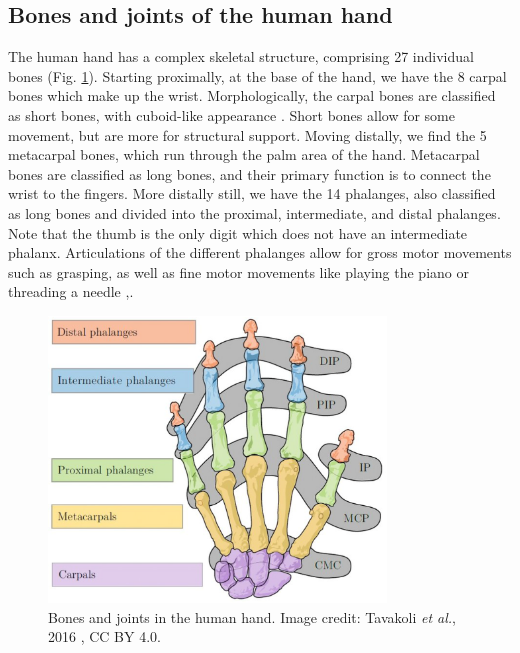 \documentclass[12pt]{article}
\begin{document}
\subsection*{Bones and joints of the human hand}
The human hand has a complex skeletal structure, comprising 27 individual bones \citep{kumar2009hand,panchal2013skeletal} (Fig. \ref{fig:bonesJoints}). Starting proximally, at the base of the hand, we have the 8 carpal bones which make up the wrist. Morphologically, the carpal bones are classified as short bones, with cuboid-like appearance \citep{openStaxBones}. Short bones allow for some movement, but are more for structural support. Moving distally, we find the 5 metacarpal bones, which run through the palm area of the hand. Metacarpal bones are classified as long bones, and their primary function is to connect the wrist to the fingers. More distally still, we have the 14 phalanges, also classified as long bones and divided into the proximal, intermediate, and distal phalanges. Note that the thumb is the only digit which does not have an intermediate phalanx. Articulations of the different phalanges allow for gross motor movements such as grasping, as well as fine motor movements like playing the piano or threading a needle \citep{duncan2013biomechanics},.

\begin{figure}[h!]
\centering
\includegraphics[width=0.8\textwidth]{images/bones_joints_hand.png}
\caption{Bones and joints in the human hand. Image credit: Tavakoli \textit{et al.}, 2016 \citep{tavakoli2016uc}, CC BY 4.0.}
\label{fig:bonesJoints}
\end{figure}
\end{document}
